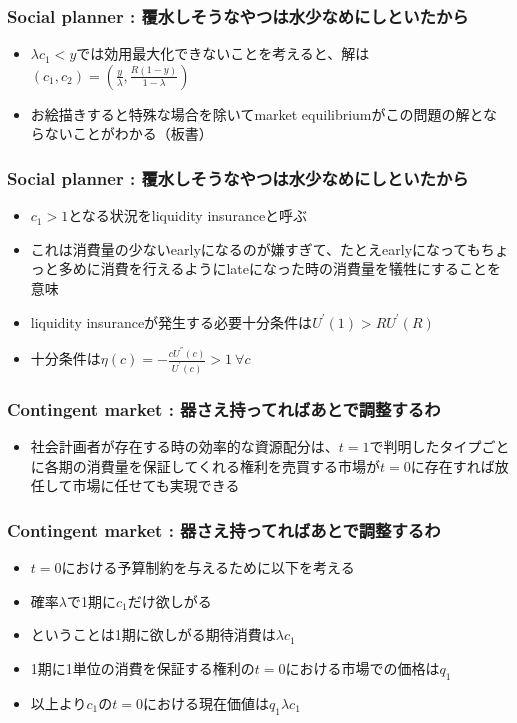 \documentclass[dvipdfmx, 12pt]{beamer}
\begin{document}
\begin{frame}\frametitle{Social planner : \small 覆水しそうなやつは水少なめにしといたから}
	\begin{itemize}
		\item $\lambda c_1 < y$では効用最大化できないことを考えると、解は$(c_1, c_2) = (\frac{y}{\lambda}, \frac{R(1 - y)}{1 - \lambda})$
		\item お絵描きすると特殊な場合を除いてmarket equilibriumがこの問題の解とならないことがわかる（板書）
	\end{itemize}
\end{frame}
\begin{frame}\frametitle{Social planner : \small 覆水しそうなやつは水少なめにしといたから}
	\begin{itemize}
		\item $c_1 > 1$となる状況をliquidity insuranceと呼ぶ
		\item これは消費量の少ないearlyになるのが嫌すぎて、たとえearlyになってもちょっと多めに消費を行えるようにlateになった時の消費量を犠牲にすることを意味
		\item liquidity insuranceが発生する必要十分条件は$U^{'}(1) > R U^{'}(R)$
		\item 十分条件は$\eta(c) = -\frac{cU^{''}(c)}{U^{'}(c)} > 1\ \forall c$
	\end{itemize}
\end{frame}
\begin{frame}\frametitle{Contingent market : \small 器さえ持ってればあとで調整するわ}
	\begin{itemize}
		\item 社会計画者が存在する時の効率的な資源配分は、$t = 1$で判明したタイプごとに各期の消費量を保証してくれる権利を売買する市場が$t = 0$に存在すれば放任して市場に任せても実現できる
	\end{itemize}
\end{frame}
\begin{frame}\frametitle{Contingent market : \small 器さえ持ってればあとで調整するわ}
	\begin{itemize}
		\item $t = 0$における予算制約を与えるために以下を考える
		\item 確率$\lambda$で1期に$c_1$だけ欲しがる
		\item ということは1期に欲しがる期待消費は$\lambda c_1$
		\item 1期に1単位の消費を保証する権利の$t = 0$における市場での価格は$q_1$
		\item 以上より$c_1$の$t = 0$における現在価値は$q_1 \lambda c_1$
	\end{itemize}
\end{frame}
\end{document}
